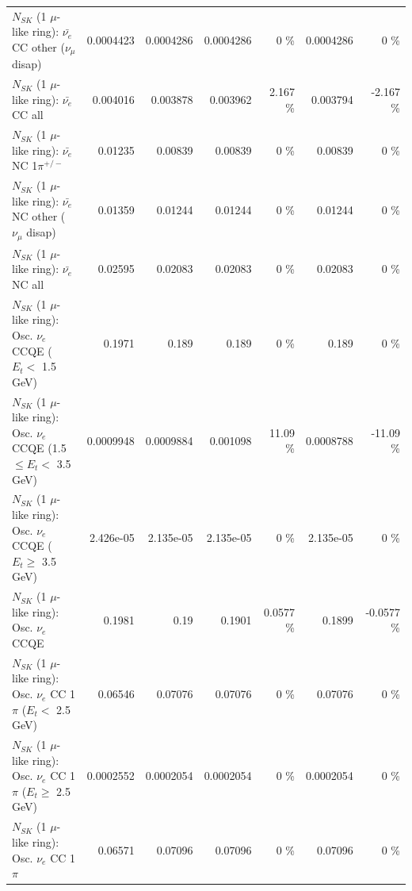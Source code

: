 \begin{table}
\begin{tabular}{| l | r | r | r  r | r  r |}
          $N_{SK}$ (1 $\mu$-like ring): $\bar{\nu_e}$ CC other ($\nu_\mu$ disap) &       0.0004423 &       0.0004286 &       0.0004286 &        0 \%  &       0.0004286 &        0 \%  \\ 
                            $N_{SK}$ (1 $\mu$-like ring): $\bar{\nu_{e}}$ CC all &        0.004016 &        0.003878 &        0.003962 &    2.167 \%  &        0.003794 &   -2.167 \%  \\ 
\hline
                     $N_{SK}$ (1 $\mu$-like ring): $\bar{\nu_e}$ NC 1$\pi^{+/-}$ &         0.01235 &         0.00839 &         0.00839 &        0 \%  &         0.00839 &        0 \%  \\ 
          $N_{SK}$ (1 $\mu$-like ring): $\bar{\nu_e}$ NC other ($\nu_\mu$ disap) &         0.01359 &         0.01244 &         0.01244 &        0 \%  &         0.01244 &        0 \%  \\ 
                            $N_{SK}$ (1 $\mu$-like ring): $\bar{\nu_{e}}$ NC all &         0.02595 &         0.02083 &         0.02083 &        0 \%  &         0.02083 &        0 \%  \\ 
\hline
\hline
\hline
             $N_{SK}$ (1 $\mu$-like ring): Osc. $\nu_e$ CCQE ($E_{t} <$ 1.5 GeV) &          0.1971 &           0.189 &           0.189 &        0 \%  &           0.189 &        0 \%  \\ 
    $N_{SK}$ (1 $\mu$-like ring): Osc. $\nu_e$ CCQE (1.5 $\leq E_{t} <$ 3.5 GeV) &       0.0009948 &       0.0009884 &        0.001098 &    11.09 \%  &       0.0008788 &   -11.09 \%  \\ 
          $N_{SK}$ (1 $\mu$-like ring): Osc. $\nu_e$ CCQE ($E_{t} \geq$ 3.5 GeV) &       2.426e-05 &       2.135e-05 &       2.135e-05 &        0 \%  &       2.135e-05 &        0 \%  \\ 
\hline
                                 $N_{SK}$ (1 $\mu$-like ring): Osc. $\nu_e$ CCQE &          0.1981 &            0.19 &          0.1901 &   0.0577 \%  &          0.1899 &  -0.0577 \%  \\ 
\hline
        $N_{SK}$ (1 $\mu$-like ring): Osc. $\nu_e$ CC 1$\pi$ ($E_{t} <$ 2.5 GeV) &         0.06546 &         0.07076 &         0.07076 &        0 \%  &         0.07076 &        0 \%  \\ 
     $N_{SK}$ (1 $\mu$-like ring): Osc. $\nu_e$ CC 1$\pi$ ($E_{t} \geq$ 2.5 GeV) &       0.0002552 &       0.0002054 &       0.0002054 &        0 \%  &       0.0002054 &        0 \%  \\ 
\hline
                            $N_{SK}$ (1 $\mu$-like ring): Osc. $\nu_e$ CC 1$\pi$ &         0.06571 &         0.07096 &         0.07096 &        0 \%  &         0.07096 &        0 \%  \\ 

\end{tabular}
\end{table}
